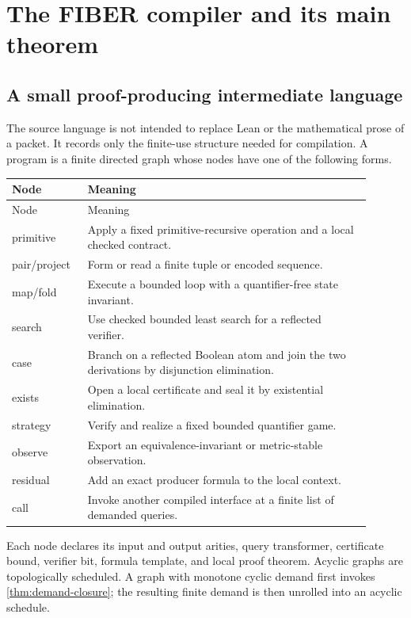 \section{The FIBER compiler and its main theorem}
\label{sec:compiler}

\subsection{A small proof-producing intermediate language}

The source language is not intended to replace Lean or the mathematical prose
of a packet.  It records only the finite-use structure needed for compilation.
A program is a finite directed graph whose nodes have one of the following
forms.

\begin{longtable}{p{0.18\linewidth}p{0.72\linewidth}}
\toprule
Node & Meaning\\
\midrule
\endfirsthead
\toprule
Node & Meaning\\
\midrule
\endhead
\textsf{primitive} & Apply a fixed primitive-recursive operation and a local checked contract.\\
\textsf{pair}/\textsf{project} & Form or read a finite tuple or encoded sequence.\\
\textsf{map}/\textsf{fold} & Execute a bounded loop with a quantifier-free state invariant.\\
\textsf{search} & Use checked bounded least search for a reflected verifier.\\
\textsf{case} & Branch on a reflected Boolean atom and join the two derivations by disjunction elimination.\\
\textsf{exists} & Open a local certificate and seal it by existential elimination.\\
\textsf{strategy} & Verify and realize a fixed bounded quantifier game.\\
\textsf{observe} & Export an equivalence-invariant or metric-stable observation.\\
\textsf{residual} & Add an exact producer formula to the local context.\\
\textsf{call} & Invoke another compiled interface at a finite list of demanded queries.\\
\bottomrule
\end{longtable}

Each node declares its input and output arities, query transformer, certificate
bound, verifier bit, formula template, and local proof theorem.  Acyclic graphs
are topologically scheduled.  A graph with monotone cyclic demand first invokes
\cref{thm:demand-closure}; the resulting finite demand is then unrolled into an
acyclic schedule.


